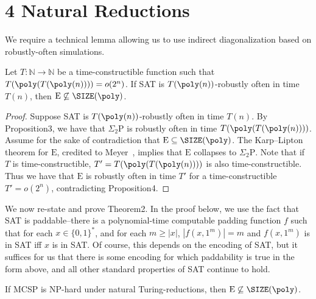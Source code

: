 \section*{4 Natural Reductions}
We require a technical lemma allowing us to use indirect diagonalization based on robustly-often simulations.
\begin{ntlemma}
Let $T:\mathbb N\to\mathbb N$ be a time-constructible function such that $T(\poly(T(\poly(n))))=o(2^n)$. If SAT is $T(\poly(n))$-robustly often in time $T(n)$, then $\mathrm E\not\subseteq\SIZE(\poly)$.
\end{ntlemma}
\begin{proof}
Suppose SAT is $T(\poly(n))$-robustly often in time $T(n)$. By Proposition3, we have that $\Sigma_2\mathrm P$ is robustly often in time $T(\poly(T(\poly(n))))$. Assume for the sake of contradiction that $\mathrm E\subseteq\SIZE(\poly)$. The Karp--Lipton theorem for $\mathrm E$, credited to Meyer~\cite{ref19}, implies that $\mathrm E$ collapses to $\Sigma_2\mathrm P$. Note that if $T$ is time-constructible, $T'=T(\poly(T(\poly(n))))$ is also time-constructible. Thus we have that $\mathrm E$ is robustly often in time $T'$ for a time-constructible $T'=o(2^n)$, contradicting Proposition4.
\end{proof}
We now re-state and prove Theorem2. In the proof below, we use the fact that SAT is paddable--there is a polynomial-time computable padding function $f$ such that for each $x\in\{0,1\}^*$, and for each $m\geq|x|$, $|f(x,1^m)|=m$ and $f(x,1^m)$ is in SAT iff $x$ is in SAT. Of course, this depends on the encoding of SAT, but it suffices for us that there is some encoding for which paddability is true in the form above, and all other standard properties of SAT continue to hold.
\begin{nttheorem}
If MCSP is NP-hard under natural Turing-reductions, then $\mathrm E\not\subseteq\SIZE(\poly)$.
\end{nttheorem}
